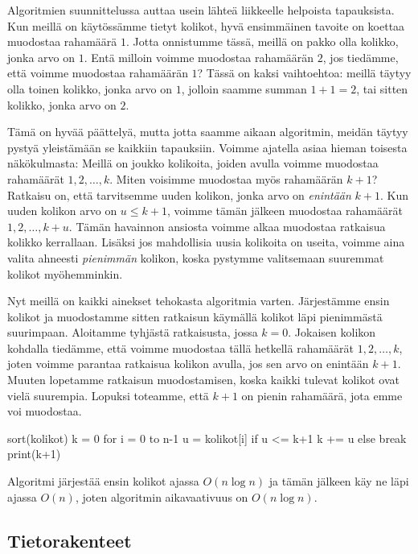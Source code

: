 Algoritmien suunnittelussa auttaa usein
lähteä liikkeelle helpoista tapauksista.
Kun meillä on käytössämme tietyt kolikot,
hyvä ensimmäinen tavoite on koettaa muodostaa rahamäärä $1$.
Jotta onnistumme tässä, meillä on pakko olla kolikko,
jonka arvo on $1$.
Entä milloin voimme muodostaa rahamäärän $2$,
jos tiedämme, että voimme muodostaa rahamäärän $1$?
Tässä on kaksi vaihtoehtoa: meillä täytyy olla
toinen kolikko, jonka arvo on $1$, jolloin saamme
summan $1+1=2$, tai sitten kolikko, jonka arvo on $2$.

Tämä on hyvää päättelyä, mutta jotta saamme aikaan algoritmin,
meidän täytyy pystyä yleistämään se kaikkiin tapauksiin.
Voimme ajatella asiaa hieman toisesta näkökulmasta:
Meillä on joukko kolikoita, joiden avulla voimme muodostaa
rahamäärät $1,2,\dots,k$.
Miten voisimme muodostaa myös rahamäärän $k+1$?
Ratkaisu on, että tarvitsemme uuden kolikon,
jonka arvo on \emph{enintään} $k+1$.
Kun uuden kolikon arvo on $u \le k+1$,
voimme tämän jälkeen muodostaa rahamäärät $1,2,\dots,k+u$.
Tämän havainnon ansiosta voimme alkaa muodostaa ratkaisua
kolikko kerrallaan.
Lisäksi jos mahdollisia uusia kolikoita on useita,
voimme aina valita ahneesti \emph{pienimmän} kolikon,
koska pystymme valitsemaan suuremmat kolikot myöhemminkin.

Nyt meillä on kaikki ainekset tehokasta algoritmia varten.
Järjes\-tämme ensin kolikot ja muodostamme sitten ratkaisun
käymällä kolikot läpi pienimmästä suurimpaan.
Aloitamme tyhjästä ratkaisusta, jossa $k=0$.
Jokaisen kolikon kohdalla tiedämme,
että voimme muodostaa tällä hetkellä rahamäärät $1,2,\dots,k$,
joten voimme parantaa ratkaisua kolikon avulla,
jos sen arvo on enintään $k+1$.
Muuten lopetamme ratkaisun muodostamisen,
koska kaikki tulevat kolikot ovat vielä suurempia.
Lopuksi toteamme, että $k+1$ on pienin rahamäärä,
jota emme voi muodostaa.

\begin{code}
sort(kolikot)
k = 0
for i = 0 to n-1
    u = kolikot[i]
    if u <= k+1
        k += u
    else
        break
print(k+1)
\end{code}

Algoritmi järjestää ensin kolikot ajassa $O(n \log n)$
ja tämän jälkeen käy ne läpi ajassa $O(n)$,
joten algoritmin aikavaativuus on $O(n \log n)$.

\subsection{Tietorakenteet}


